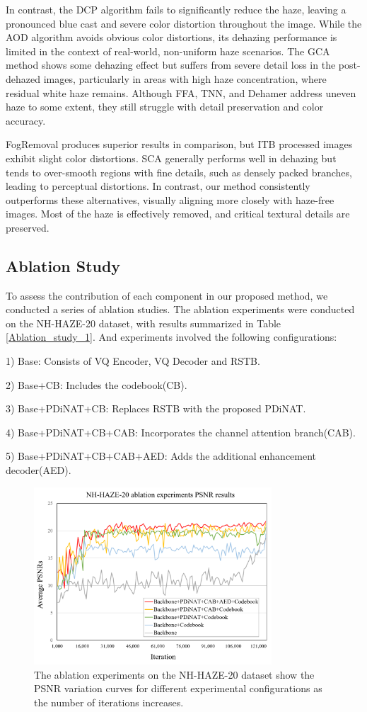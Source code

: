 \documentclass[lettersize,journal]{IEEEtran}
\begin{document}
In contrast, the DCP algorithm fails to significantly reduce the haze, leaving a pronounced blue cast and severe color distortion throughout the image. While the AOD algorithm avoids obvious color distortions, its dehazing performance is limited in the context of real-world, non-uniform haze scenarios. The GCA method shows some dehazing effect but suffers from severe detail loss in the post-dehazed images, particularly in areas with high haze concentration, where residual white haze remains. Although FFA, TNN, and Dehamer address uneven haze to some extent, they still struggle with detail preservation and color accuracy.

FogRemoval produces superior results in comparison, but ITB processed images exhibit slight color distortions. SCA generally performs well in dehazing but tends to over-smooth regions with fine details, such as densely packed branches, leading to perceptual distortions. In contrast, our method consistently outperforms these alternatives, visually aligning more closely with haze-free images. Most of the haze is effectively removed, and critical textural details are preserved.

\subsection{Ablation Study}
To assess the contribution of each component in our proposed method, we conducted a series of ablation studies. The ablation experiments were conducted on the NH-HAZE-20 dataset, with results summarized in Table \ref{Ablation_study_1}. And experiments involved the following configurations:

1) Base: Consists of VQ Encoder, VQ Decoder and RSTB\cite{liang2021swinir}.

2) Base+CB: Includes the codebook(CB).

3) Base+PDiNAT+CB: Replaces RSTB with the proposed PDiNAT.

4) Base+PDiNAT+CB+CAB: Incorporates the channel attention branch(CAB).

5) Base+PDiNAT+CB+CAB+AED: Adds the additional enhancement decoder(AED).

\begin{figure}[!t]
	\centering
	\includegraphics[width=3.5in]{ablation_experiments}
	\caption{The ablation experiments on the NH-HAZE-20 dataset show the PSNR variation curves for different experimental configurations as the number of iterations increases.}
	\label{Ablation_study_2}
\end{figure}
 
\end{document}
